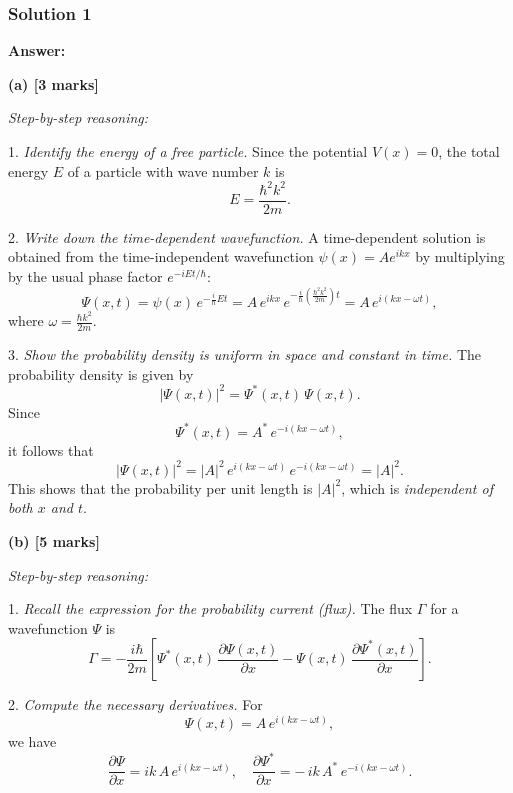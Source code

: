 \documentclass{article}
\begin{document}
\subsubsection{Solution 1}

\noindent \textbf{Answer:}

\vspace{1em}
\noindent \textbf{(a) [3 marks]}
\vspace{0.5em}

\noindent \emph{Step-by-step reasoning:}

1. \emph{Identify the energy of a free particle.}  
   Since the potential $V(x)=0$, the total energy $E$ of a particle with wave number $k$ is 
   \[
     E = \frac{\hbar^2 k^2}{2m}.
   \]

2. \emph{Write down the time-dependent wavefunction.}  
   A time-dependent solution is obtained from the time-independent wavefunction $\psi(x) = A e^{ikx}$ by multiplying by the usual phase factor $e^{-iEt/\hbar}$:
   \[
     \Psi(x,t) = \psi(x) \, e^{-\frac{i}{\hbar} E t}
     = A \, e^{ikx} \, e^{-\frac{i}{\hbar} \left(\frac{\hbar^2 k^2}{2m}\right) t}
     = A \, e^{i \left(k x - \omega t\right)},
   \]
   where $\omega = \frac{\hbar k^2}{2m}$.

3. \emph{Show the probability density is uniform in space and constant in time.}  
   The probability density is given by
   \[
     |\Psi(x,t)|^2 = \Psi^*(x,t)\,\Psi(x,t).
   \]
   Since
   \[
     \Psi^*(x,t) = A^* \, e^{-i \left(k x - \omega t\right)},
   \]
   it follows that
   \[
     |\Psi(x,t)|^2 
     = |A|^2 \, e^{i(k x - \omega t)} \, e^{-i(k x - \omega t)} 
     = |A|^2.
   \]
   This shows that the probability per unit length is $|A|^2$, which is \emph{independent of both $x$ and $t$}.

\vspace{1em}
\noindent \textbf{(b) [5 marks]}
\vspace{0.5em}

\noindent \emph{Step-by-step reasoning:}

1. \emph{Recall the expression for the probability current (flux).}  
   The flux $\Gamma$ for a wavefunction $\Psi$ is
   \[
     \Gamma = -\frac{i\hbar}{2m}
     \left[
       \Psi^*(x,t)\,\frac{\partial \Psi(x,t)}{\partial x}
       - \Psi(x,t)\,\frac{\partial \Psi^*(x,t)}{\partial x}
     \right].
   \]

2. \emph{Compute the necessary derivatives.}  
   For
   \[
     \Psi(x,t) = A \, e^{i(kx - \omega t)}, 
   \]
   we have
   \[
     \frac{\partial \Psi}{\partial x} 
     = i k \, A \, e^{i(kx - \omega t)}, 
     \quad
     \frac{\partial \Psi^*}{\partial x} 
     = -\,i k \, A^* \, e^{-i(kx - \omega t)}.
   \]
\end{document}
